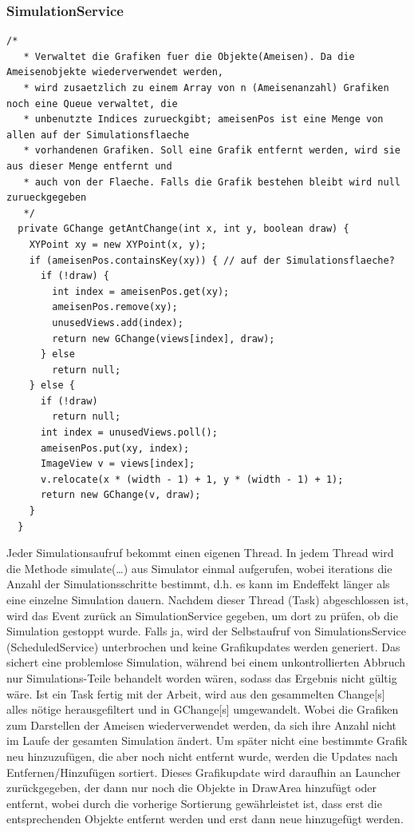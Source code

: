 \documentclass[a4paper,12pt]{scrartcl}
\begin{document}
\subsubsection*{SimulationService}
\begin{lstlisting}[caption={Grafikverwaltung in SimulationService}]
  /*
   * Verwaltet die Grafiken fuer die Objekte(Ameisen). Da die Ameisenobjekte wiederverwendet werden,
   * wird zusaetzlich zu einem Array von n (Ameisenanzahl) Grafiken noch eine Queue verwaltet, die
   * unbenutzte Indices zurueckgibt; ameisenPos ist eine Menge von allen auf der Simulationsflaeche
   * vorhandenen Grafiken. Soll eine Grafik entfernt werden, wird sie aus dieser Menge entfernt und
   * auch von der Flaeche. Falls die Grafik bestehen bleibt wird null zurueckgegeben
   */
  private GChange getAntChange(int x, int y, boolean draw) {
    XYPoint xy = new XYPoint(x, y);
    if (ameisenPos.containsKey(xy)) { // auf der Simulationsflaeche?
      if (!draw) {
        int index = ameisenPos.get(xy);
        ameisenPos.remove(xy);
        unusedViews.add(index);
        return new GChange(views[index], draw);
      } else
        return null;
    } else {
      if (!draw)
        return null;
      int index = unusedViews.poll();
      ameisenPos.put(xy, index);
      ImageView v = views[index];
      v.relocate(x * (width - 1) + 1, y * (width - 1) + 1);
      return new GChange(v, draw);
    }
  }
\end{lstlisting}
Jeder Simulationsaufruf bekommt einen eigenen Thread. In jedem Thread wird die Methode simulate(\dots{}) aus Simulator einmal aufgerufen, wobei iterations die Anzahl der Simulationsschritte bestimmt, d.h. es kann im Endeffekt länger als eine einzelne Simulation dauern. Nachdem dieser Thread (Task) abgeschlossen ist, wird das Event zurück an SimulationService gegeben, um dort zu prüfen, ob die Simulation gestoppt wurde. Falls ja, wird der Selbstaufruf von SimulationsService (ScheduledService) unterbrochen und keine Grafikupdates werden generiert. Das sichert eine problemlose Simulation, während bei einem unkontrollierten Abbruch nur Simulations-Teile behandelt worden wären, sodass das Ergebnis nicht gültig wäre.
Ist ein Task fertig mit der Arbeit, wird aus den gesammelten Change[s] alles nötige herausgefiltert und in GChange[s] umgewandelt. Wobei die Grafiken zum Darstellen der Ameisen wiederverwendet werden, da sich ihre Anzahl nicht im Laufe der gesamten Simulation ändert. Um später nicht eine bestimmte Grafik neu hinzuzufügen, die aber noch nicht entfernt wurde, werden die Updates nach Entfernen/Hinzufügen sortiert. Dieses Grafikupdate wird daraufhin an Launcher zurückgegeben, der dann nur noch die Objekte in DrawArea hinzufügt oder entfernt, wobei durch die vorherige Sortierung gewährleistet ist, dass erst die entsprechenden Objekte entfernt werden und erst dann neue hinzugefügt werden.
\end{document}
